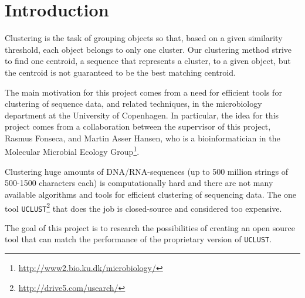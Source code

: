 \section{Introduction}
Clustering is the task of grouping objects so that, based on a given similarity
threshold, each object belongs to only one cluster. Our clustering method strive to find one centroid, a sequence that represents a cluster, to a given object, but the centroid is not guaranteed to be the best matching centroid.

The main motivation for this project comes from a need for efficient tools for
clustering of sequence data, and related techniques, in the microbiology
department at the University of Copenhagen. In particular, the idea for this
project comes from a collaboration between the supervisor of this project,
Rasmus Fonseca, and Martin Asser Hansen, who is a bioinformatician in the
Molecular Microbial Ecology
Group\footnote{\url{http://www2.bio.ku.dk/microbiology/}}.

Clustering huge amounts of DNA/RNA-sequences (up to 500
million strings of 500-1500 characters each) is computationally hard and there are not many available algorithms and tools for efficient clustering of
sequencing data. The one tool
\texttt{UCLUST}\footnote{\url{http://drive5.com/usearch/}} that does the job is
closed-source and considered too expensive.

The goal of this project is to research the possibilities of creating an open source tool that can match the performance of the proprietary version of
\texttt{UCLUST}.
